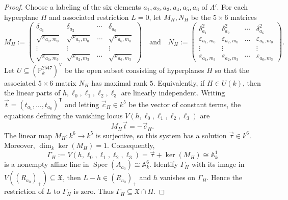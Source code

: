 \documentclass[reqno,11pt]{amsart}
\numberwithin{equation}{section}
\theoremstyle{definition}
\theoremstyle{definition}
\theoremstyle{definition}
\theoremstyle{remark}
\renewcommand{\ker}{\operatorname{ker}}
\newcommand{\Spec}{\operatorname{Spec}}
\newcommand{\PP}{\mathbb{P}}
\begin{document}
\begin{proof}
    
    Choose a labeling of the six elements $a_1,a_2,a_3,a_4,a_5,a_6$ of $\Lambda'$. For each hyperplane $H$ and associated restriction $L=0$, let $M_H,N_H$ be the $5\times6$ matrices
    \[
    M_H:=\begin{pmatrix}
        \delta_{a_1} & \delta_{a_2} & \cdots & \delta_{a_6} \\
        \sqrt{\varepsilon_{a_1,m_0}} & \sqrt{\varepsilon_{a_2,m_0}} & \ldots & \sqrt{\varepsilon_{a_6,m_0}}\\
        \vdots & \vdots & & \vdots\\
        \sqrt{\varepsilon_{a_1,m_3}} & \sqrt{\varepsilon_{a_2,m_3}} & \cdots & \sqrt{\varepsilon_{a_6,m_3}}
    \end{pmatrix} \quad \mbox{and} \quad
    N_H:=\begin{pmatrix}
        \delta_{a_1}^2 & \delta_{a_2}^2 & \cdots & \delta_{a_6}^2 \\
        {\varepsilon_{a_1,m_0}} & {\varepsilon_{a_2,m_0}} & \ldots & {\varepsilon_{a_6,m_0}}\\
        \vdots & \vdots & & \vdots\\
        {\varepsilon_{a_1,m_3}} & {\varepsilon_{a_2,m_3}} & \cdots & {\varepsilon_{a_6,m_3}}
    \end{pmatrix}.
    \]
    Let $U\subseteq (\PP^{2547}_k)^{\vee}$ be the open subset consisting of hyperplanes $H$ so that the associated $5\times6$ matrix $N_H$ has maximal rank $5$. Equivalently, if $H\in U(k)$, then the linear parts of $h,\ell_0,\ell_1,\ell_2,\ell_3$ are linearly independent. Writing $\vec{t}=(t_{a_1},\ldots,t_{a_6})^{\mathsf T}$ and
    letting $\vec c_H\in k^5$ be the vector of constant terms,
    the equations defining the vanishing locus $V(h,\ell_0,\ell_1,\ell_2,\ell_3)$ are
    \[
        M_H\vec{t}=-\vec c_H.
    \]
    The linear map $M_H:k^6\to k^5$ is surjective, so this
    system has a solution $\vec{\tau}\in k^6$.
    Moreover, $\dim_k\ker(M_H)=1$. Consequently,
    \[
        \Gamma_H
        :=V(h,\ell_0,\ell_1,\ell_2,\ell_3)
        =\vec\tau+\ker(M_H)
        \cong\mathbb A_k^1
    \]
    is a nonempty affine line in $\Spec(A_{a_0})\cong\mathbb A_k^6$. Identify $\Gamma_H$ with its image in $V((R_{a_0})_+)\subseteq \mathfrak{X}$, then $L-h\in(R_{a_0})_+$ and $h$ vanishes on $\Gamma_H$. Hence the restriction of $L$ to $\Gamma_H$ is zero. Thus $\Gamma_H\subseteq \mathfrak{X}\cap H$. 
    

\end{proof}
\end{document}

